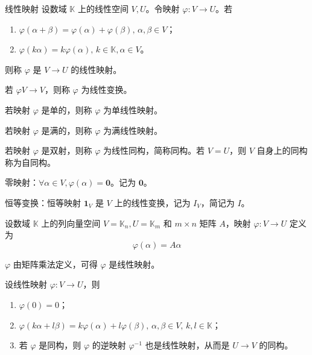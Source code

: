 \begin{definition}{线性映射}
  设数域 $\mathbb{K}$ 上的线性空间 $V,U$。令映射 $\varphi : V \to U$。若
  \begin{enumerate}
    \item $\varphi(\alpha + \beta) = \varphi(\alpha) + \varphi(\beta),\, \alpha,\beta \in V$；
    \item $\varphi(k\alpha) = k\varphi(\alpha),\, k \in \mathbb{K},\alpha \in V$。
  \end{enumerate}
  则称 $\varphi$ 是 $V \to U$ 的线性映射。

  若 $\varphi V \to V$，则称 $\varphi$ 为线性变换。

  若映射 $\varphi$ 是单的，则称 $\varphi$ 为单线性映射。

  若映射 $\varphi$ 是满的，则称 $\varphi$ 为满线性映射。

  若映射 $\varphi$ 是双射，则称 $\varphi$ 为线性同构，简称同构。若 $V = U$，则 $V$ 自身上的同构称为自同构。
\end{definition}

\hfill

\begin{example}
  零映射：$\forall \alpha \in V, \varphi(\alpha) = \mathbf{0}$。记为 $\mathbf{0}$。
\end{example}

\hfill

\begin{example}
  恒等变换：恒等映射 $\mathbf{1}_V$ 是 $V$ 上的线性变换，记为 $I_V$，简记为 $I$。
\end{example}

\hfill

\begin{example}\label{example-1.7}
  设数域 $\mathbb{K}$ 上的列向量空间 $V = \mathbb{K}_n, U = \mathbb{K}_m$ 和 $m \times n$ 矩阵 $A$，映射 $\varphi : V \to U$ 定义为
  \[\varphi(\alpha) = A\alpha\]

  $\varphi$ 由矩阵乘法定义，可得 $\varphi$ 是线性映射。
\end{example}

\hfill

\begin{proposition}
  设线性映射 $\varphi : V \to U$，则
  \begin{enumerate}
    \item $\varphi(0) = 0$；
    \item $\varphi(k\alpha + l\beta) = k\varphi(\alpha) + l\varphi(\beta),\, \alpha,\beta \in V,\, k,l \in \mathbb{K}$；
    \item 若 $\varphi$ 是同构，则 $\varphi$ 的逆映射 $\varphi^{-1}$ 也是线性映射，从而是 $U \to V$ 的同构。
  \end{enumerate}
\end{proposition}



